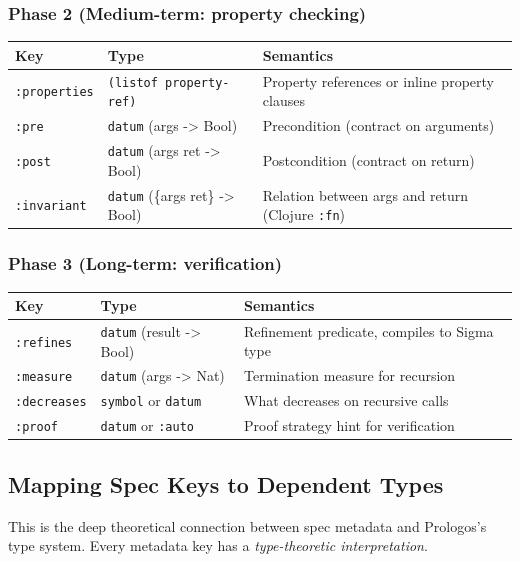 \documentclass[11pt]{article}
\begin{document}
\subsubsection{Phase 2 (Medium-term: property checking)}
\label{sec:org0add3e9}

\begin{center}
\begin{tabular}{lll}
Key & Type & Semantics\\
\hline
\texttt{:properties} & \texttt{(listof property-ref)} & Property references or inline property clauses\\
\texttt{:pre} & \texttt{datum} (args -> Bool) & Precondition (contract on arguments)\\
\texttt{:post} & \texttt{datum} (args ret -> Bool) & Postcondition (contract on return)\\
\texttt{:invariant} & \texttt{datum} (\{args ret\} -> Bool) & Relation between args and return (Clojure \texttt{:fn})\\
\end{tabular}
\end{center}
\subsubsection{Phase 3 (Long-term: verification)}
\label{sec:org03776c9}

\begin{center}
\begin{tabular}{lll}
Key & Type & Semantics\\
\hline
\texttt{:refines} & \texttt{datum} (result -> Bool) & Refinement predicate, compiles to Sigma type\\
\texttt{:measure} & \texttt{datum} (args -> Nat) & Termination measure for recursion\\
\texttt{:decreases} & \texttt{symbol} or \texttt{datum} & What decreases on recursive calls\\
\texttt{:proof} & \texttt{datum} or \texttt{:auto} & Proof strategy hint for verification\\
\end{tabular}
\end{center}
\subsection{Mapping Spec Keys to Dependent Types}
\label{sec:org5069bc2}

This is the deep theoretical connection between spec metadata and Prologos's
type system. Every metadata key has a \emph{type-theoretic interpretation}.
\end{document}
